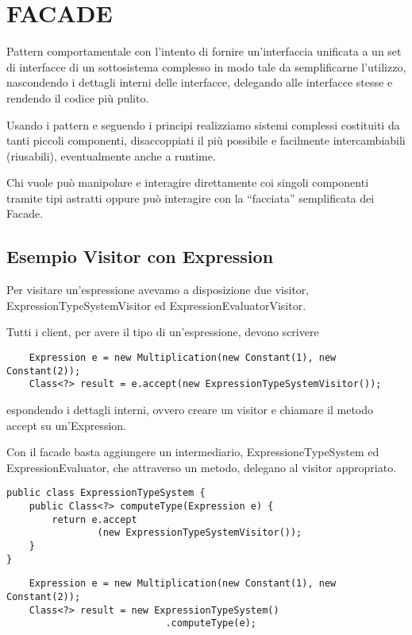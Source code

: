 \chapter{FACADE}

Pattern comportamentale con l'intento di fornire un'interfaccia unificata a un set di interfacce di un sottosistema complesso in modo tale da semplificarne l'utilizzo, 
nascondendo i dettagli interni delle interfacce, delegando alle interfacce stesse e rendendo il codice più pulito.

Usando i pattern e seguendo i principi realizziamo sistemi complessi costituiti da tanti piccoli componenti, disaccoppiati il più possibile e facilmente 
intercambiabili (riusabili), eventualmente anche a runtime.

Chi vuole può manipolare e interagire direttamente coi singoli componenti tramite tipi astratti oppure può interagire con la “facciata” semplificata dei Facade.

\section{Esempio Visitor con Expression}

Per visitare un'espressione avevamo a disposizione due visitor, ExpressionTypeSystemVisitor ed ExpressionEvaluatorVisitor.

Tutti i client, per avere il tipo di un’espressione, devono scrivere

\begin{lstlisting}
    Expression e = new Multiplication(new Constant(1), new Constant(2));
    Class<?> result = e.accept(new ExpressionTypeSystemVisitor());
\end{lstlisting}

espondendo i dettagli interni, ovvero creare un visitor e chiamare il metodo accept su un'Expression.

Con il facade basta aggiungere un intermediario, ExpressioneTypeSystem ed ExpressionEvaluator, che attraverso un metodo, delegano al visitor appropriato.

\begin{multicols}{2}
\begin{lstlisting}
public class ExpressionTypeSystem {
    public Class<?> computeType(Expression e) {
        return e.accept
                (new ExpressionTypeSystemVisitor());
    }
}
\end{lstlisting}

\columnbreak

\begin{lstlisting}
    Expression e = new Multiplication(new Constant(1), new Constant(2));
    Class<?> result = new ExpressionTypeSystem()
                            .computeType(e);
\end{lstlisting}
\end{multicols}


